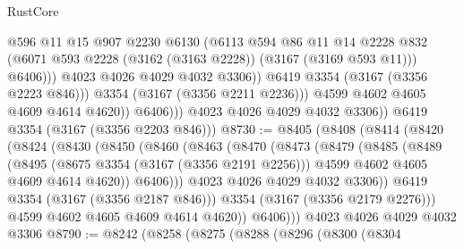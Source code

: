 \begin{lexlean}{RustCore}
\begin{coremodule}
                                @596
                                @11
                                @15
                                @907
                                @2230
                                @6130
                                (@6113
                                  @594
                                  @86
                                  @11
                                  @14
                                  @2228
                                  @832
                                  (@6071 @593 @2228 (@3162 (@3163 @2228)) (@3167 (@3169 @593 @11)))
                                  @6406)))
                            @4023
                            @4026
                            @4029
                            @4032
                            @3306))
                        @6419
                        @3354
                        (@3167 (@3356 @2223 @846)))
                      @3354
                      (@3167 (@3356 @2211 @2236)))
                    @4599
                    @4602
                    @4605
                    @4609
                    @4614
                    @4620))
                @6406)))
          @4023
          @4026
          @4029
          @4032
          @3306))
      @6419
      @3354
      (@3167 (@3356 @2203 @846)))
@8730 := @8405
    (@8408
      (@8414
        (@8420
          (@8424
            (@8430
              (@8450
                (@8460
                  (@8463
                    (@8470
                      (@8473
                        (@8479
                          (@8485
                            (@8489
                              (@8495
                                (@8675 @3354 (@3167 (@3356 @2191 @2256)))
                                @4599
                                @4602
                                @4605
                                @4609
                                @4614
                                @4620))
                            @6406)))
                      @4023
                      @4026
                      @4029
                      @4032
                      @3306))
                  @6419
                  @3354
                  (@3167 (@3356 @2187 @846)))
                @3354
                (@3167 (@3356 @2179 @2276)))
              @4599
              @4602
              @4605
              @4609
              @4614
              @4620))
          @6406)))
    @4023
    @4026
    @4029
    @4032
    @3306
@8790 := @8242
    (@8258
      (@8275
        (@8288
          (@8296
            (@8300
              (@8304

\end{coremodule}
\end{lexlean}
